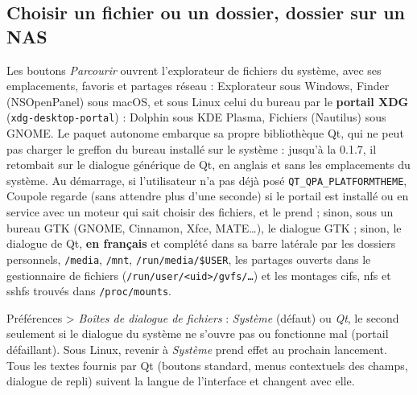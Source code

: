 \subsection{Choisir un fichier ou un dossier, dossier sur un NAS}\label{sec:dialogues}
Les boutons \emph{Parcourir} ouvrent l'explorateur de fichiers du système, avec ses emplacements, favoris et partages
réseau : Explorateur sous Windows, Finder (NSOpenPanel) sous macOS, et sous Linux celui du bureau par le
\textbf{portail XDG} (\texttt{xdg-desktop-portal}) : Dolphin sous KDE Plasma, Fichiers (Nautilus) sous GNOME. Le paquet
autonome embarque sa propre bibliothèque Qt, qui ne peut pas charger le greffon du bureau installé sur le système :
jusqu'à la 0.1.7, il retombait sur le dialogue générique de Qt, en anglais et sans les emplacements du système. Au
démarrage, si l'utilisateur n'a pas déjà posé \texttt{QT\_QPA\_PLATFORMTHEME}, Coupole regarde (sans attendre plus
d'une seconde) si le portail est installé ou en service avec un moteur qui sait choisir des fichiers, et le prend ;
sinon, sous un bureau GTK (GNOME, Cinnamon, Xfce, MATE…), le dialogue GTK ; sinon, le dialogue de Qt, \textbf{en
français} et complété dans sa barre latérale par les dossiers personnels, \texttt{/media}, \texttt{/mnt},
\texttt{/run/media/\$USER}, les partages ouverts dans le gestionnaire de fichiers (\texttt{/run/user/<uid>/gvfs/…}) et
les montages cifs, nfs et sshfs trouvés dans \texttt{/proc/mounts}.

Préférences > \emph{Boîtes de dialogue de fichiers} : \emph{Système} (défaut) ou \emph{Qt}, le second seulement si le
dialogue du système ne s'ouvre pas ou fonctionne mal (portail défaillant). Sous Linux, revenir à \emph{Système} prend
effet au prochain lancement. Tous les textes fournis par Qt (boutons standard, menus contextuels des champs, dialogue
de repli) suivent la langue de l'interface et changent avec elle.

